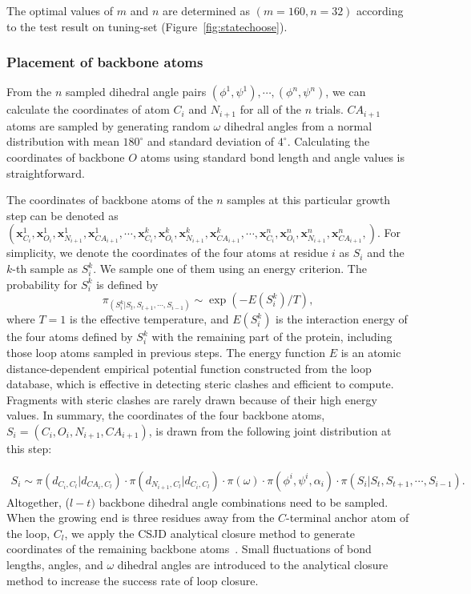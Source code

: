 The optimal values of $m$ and $n$ are determined as $(m = 160, n=
32)$ according to the test result on tuning-set
(Figure~\ref{fig:statechoose}).



\subsubsection*{Placement of backbone atoms}

From the $n$ sampled dihedral angle pairs $(\phi^{1},\psi^{1}),
\cdots, (\phi^{n},\psi^{n})$, we can calculate the coordinates of
atom $C_i$ and $N_{i+1}$ for all of the $n$ trials. $CA_{i+1}$ atoms
are sampled by generating random $\omega$ dihedral angles from a
normal distribution with mean $180^{\circ}$ and standard deviation
of $4^{\circ}$. Calculating the coordinates of backbone $O$ atoms
using standard bond length and angle values is straightforward.

The coordinates of backbone atoms of the $n$ samples at this
particular growth step can be denoted as $(\mathbf{x}^{1}_{C_i},
\mathbf{x}^{1}_{O_{i}}, \mathbf{x}^{1}_{N_{i+1}},
\mathbf{x}^{1}_{CA_{i+1}}, \cdots, \mathbf{x}^{k}_{C_i},
\mathbf{x}^{k}_{O_{i}}, \mathbf{x}^{k}_{N_{i+1}},
\mathbf{x}^{k}_{CA_{i+1}}, \cdots, \mathbf{x}^{n}_{C_i},
\mathbf{x}^{n}_{O_{i}}, \mathbf{x}^{n}_{N_{i+1}},
\mathbf{x}^{n}_{CA_{i+1}}, )$. For simplicity, we denote the
coordinates of the four atoms at residue $i$ as $S_i$ and the $k$-th
sample as $S^k_i$. We sample one of them using an energy criterion.
The probability for $S^k_i$ is defined by
$$
\pi_(S^k_i| S_t,S_{t+1},\cdots,S_{i-1}) \sim \exp({-E(S^k_i)}/T ),
$$ where $T=1$ is the effective temperature, and $E(S^k_i)$ is
the interaction energy of the four atoms defined by $S^k_i$ with the
remaining part of the protein, including those loop atoms sampled in
previous steps. The energy function $E$ is an atomic
distance-dependent empirical potential function constructed from the
loop database, which is effective in detecting steric clashes and
efficient to compute. Fragments with steric clashes are rarely drawn
because of their high energy values. In summary, the coordinates of
the four backbone atoms, $S_i = (C_i, O_i, N_{i+1}, CA_{i+1})$, is
drawn from the following joint distribution at this step:

\begin{equation}
    \left. \begin{aligned}
    S_i\sim \pi(d_{C_i,C_l} | d_{CA_i,C_l}) \cdot \pi(d_{N_{i+1},C_l} | d_{C_i, C_l}) \cdot \pi(\omega) \cdot \pi(\phi^{i},\psi^{i},\alpha_{i})\cdot  \pi(S_i| S_t,S_{t+1},\cdots,S_{i-1})
.
    \end{aligned} \right.
\end{equation}
Altogether, ($l-t)$ backbone dihedral angle combinations need to be
sampled. When the growing end is three residues away from the
$C$-terminal anchor atom of the loop, $C_l$, we apply the CSJD
analytical closure method to generate coordinates of the remaining
backbone atoms~\cite{coutsias2004}. Small fluctuations of bond
lengths, angles, and $\omega$ dihedral angles are introduced to the
analytical closure method to increase the success rate of loop
closure.

